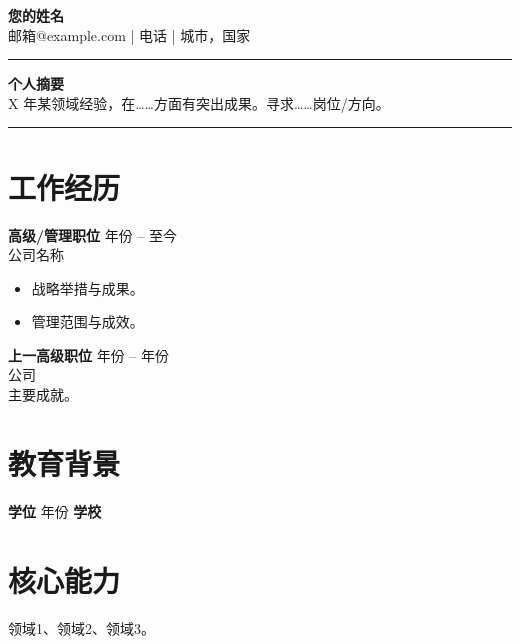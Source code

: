 \documentclass[11pt,a4paper]{article}
\begin{document}
\begin{center}
{\LARGE \textbf{您的姓名}}\\[0.2em]
邮箱@example.com \quad | \quad 电话 \quad | \quad 城市，国家
\end{center}
\begin{flushright}\rule{2cm}{2.5cm}\end{flushright}
\vspace{0.4em}
\noindent\textbf{个人摘要}\\
X 年某领域经验，在……方面有突出成果。寻求……岗位/方向。

\vspace{0.5em}
\noindent\rule{\textwidth}{0.4pt}

\section*{工作经历}
\textbf{高级/管理职位} \hfill 年份 -- 至今 \\
公司名称 \\
\begin{itemize}
  \item 战略举措与成果。
  \item 管理范围与成效。
\end{itemize}

\textbf{上一高级职位} \hfill 年份 -- 年份 \\
公司 \\
主要成就。

\section*{教育背景}
\textbf{学位} \hfill 年份 \quad \textbf{学校}

\section*{核心能力}
领域1、领域2、领域3。
\end{document}
